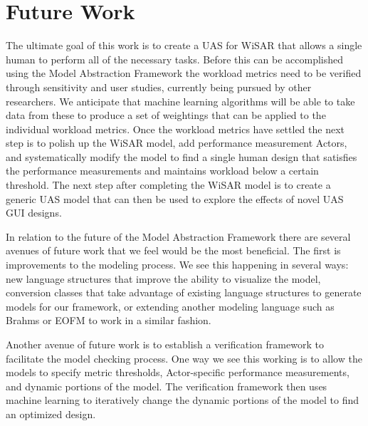 \section{Future Work}

The ultimate goal of this work is to create a UAS for WiSAR that allows a single human to perform all of the necessary tasks.  Before this can be accomplished using the Model Abstraction Framework the workload metrics need to be verified through sensitivity and user studies, currently being pursued by other researchers.  We anticipate that machine learning algorithms will be able to take data from these to produce a set of weightings that can be applied to the individual workload metrics.  Once the workload metrics have settled the next step is to polish up the WiSAR model, add performance measurement Actors, and systematically modify the model to find a single human design that satisfies the performance measurements and maintains workload below a certain threshold.  The next step after completing the WiSAR model is to create a generic UAS model that can then be used to explore the effects of novel UAS GUI designs.

In relation to the future of the Model Abstraction Framework there are several avenues of future work that we feel would be the most beneficial.  The first is improvements to the modeling process.  We see this happening in several ways: new language structures that improve the ability to visualize the model, conversion classes that take advantage of existing language structures to generate models for our framework, or extending another modeling language such as Brahms or EOFM to work in a similar fashion.

Another avenue of future work is to establish a verification framework to facilitate the model checking process.  One way we see this working is to allow the models to specify metric thresholds, Actor-specific performance measurements, and dynamic portions of the model.  The verification framework then uses machine learning to iteratively change the dynamic portions of the model to find an optimized design.



